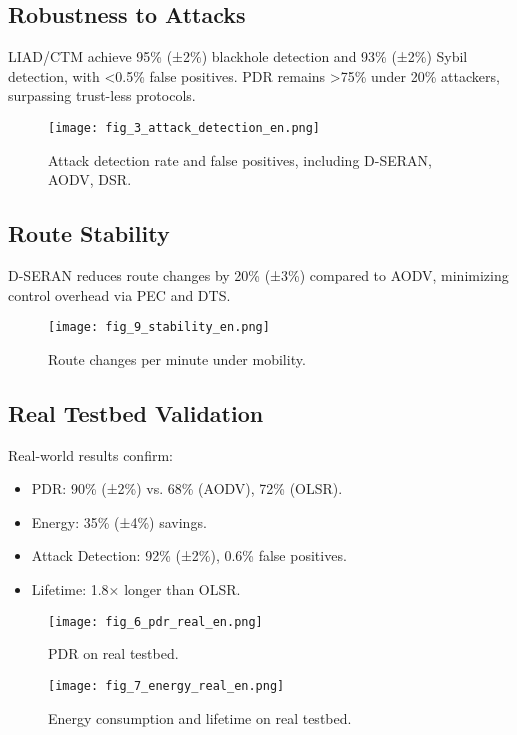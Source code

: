 \documentclass[preprint]{elsarticle}
\begin{document}
\subsection{Robustness to Attacks}
LIAD/CTM achieve 95\% (±2\%) blackhole detection and 93\% (±2\%) Sybil detection, with <0.5\% false positives. PDR remains >75\% under 20\% attackers, surpassing trust-less protocols.

\begin{figure}[!t]
    \centering
    \texttt{[image: fig\_3\_attack\_detection\_en.png]}
    \caption{Attack detection rate and false positives, including D-SERAN, AODV, DSR.}
    \label{fig:attacks}
\end{figure}

\subsection{Route Stability}
D-SERAN reduces route changes by 20\% (±3\%) compared to AODV, minimizing control overhead via PEC and DTS.

\begin{figure}[!t]
    \centering
    \texttt{[image: fig\_9\_stability\_en.png]}
    \caption{Route changes per minute under mobility.}
    \label{fig:stability}
\end{figure}

\subsection{Real Testbed Validation}
Real-world results confirm:
\begin{itemize}
    \item PDR: 90\% (±2\%) vs. 68\% (AODV), 72\% (OLSR).
    \item Energy: 35\% (±4\%) savings.
    \item Attack Detection: 92\% (±2\%), 0.6\% false positives.
    \item Lifetime: 1.8× longer than OLSR.
\end{itemize}

\begin{figure}[!t]
    \centering
    \texttt{[image: fig\_6\_pdr\_real\_en.png]}
    \caption{PDR on real testbed.}
    \label{fig:pdr_real}
\end{figure}

\begin{figure}[!t]
    \centering
    \texttt{[image: fig\_7\_energy\_real\_en.png]}
    \caption{Energy consumption and lifetime on real testbed.}
    \label{fig:energy_real}
\end{figure}
\end{document}
